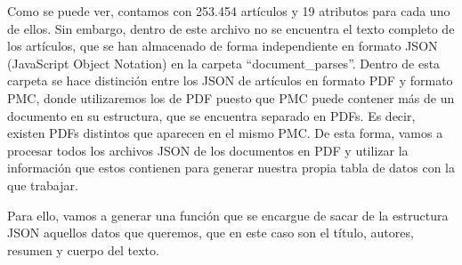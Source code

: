 \documentclass[10pt, a4paper]{article}
\begin{document}
    


Como se puede ver, contamos con 253.454 artículos y 19 atributos para cada uno de ellos. Sin embargo, dentro de este archivo no se encuentra el texto completo de los artículos, que se han almacenado de forma independiente en formato JSON (JavaScript Object Notation) en la carpeta ``document\_parses''. Dentro de esta carpeta se hace distinción entre los JSON de artículos en formato PDF y formato PMC, donde utilizaremos los de PDF puesto que PMC puede contener más de un documento en su estructura, que se encuentra separado en PDFs. Es decir, existen PDFs distintos que aparecen en el mismo PMC. De esta forma, vamos a procesar todos los archivos JSON de los documentos en PDF y utilizar la información que estos contienen para generar nuestra propia tabla de datos con la que trabajar.

Para ello, vamos a generar una función que se encargue de sacar de la estructura JSON aquellos datos que queremos, que en este caso son el título, autores, resumen y cuerpo del texto.
\end{document}
